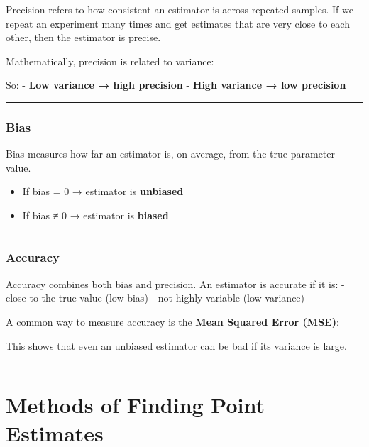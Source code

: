 \documentclass[
  letterpaper,
  DIV=11,
  numbers=noendperiod]{scrartcl}
\providecommand{\tightlist}{%
  \setlength{\itemsep}{0pt}\setlength{\parskip}{0pt}}
\begin{document}
Precision refers to how consistent an estimator is across repeated
samples. If we repeat an experiment many times and get estimates that
are very close to each other, then the estimator is precise.

Mathematically, precision is related to variance:

So: - \textbf{Low variance → high precision} - \textbf{High variance →
low precision}

\begin{center}\rule{0.5\linewidth}{0.5pt}\end{center}

\subsubsection{Bias}\label{bias}

Bias measures how far an estimator is, on average, from the true
parameter value.

\begin{itemize}
\tightlist
\item
  If bias = 0 → estimator is \textbf{unbiased}
\item
  If bias ≠ 0 → estimator is \textbf{biased}
\end{itemize}

\begin{center}\rule{0.5\linewidth}{0.5pt}\end{center}

\subsubsection{Accuracy}\label{accuracy}

Accuracy combines both bias and precision. An estimator is accurate if
it is: - close to the true value (low bias) - not highly variable (low
variance)

A common way to measure accuracy is the \textbf{Mean Squared Error
(MSE)}:

This shows that even an unbiased estimator can be bad if its variance is
large.

\begin{center}\rule{0.5\linewidth}{0.5pt}\end{center}

\section{Methods of Finding Point
Estimates}\label{methods-of-finding-point-estimates}
\end{document}
